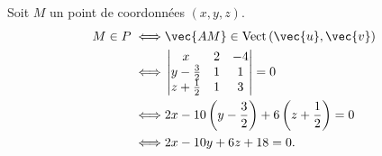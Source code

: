 \begin{enumerate}
		Soit $M$ un point de coordonnées $(x, y, z)$.
		\begin{align*}
			M \in P \iff& \vec{AM} \in \Vect\left( \vec{u}, \vec{v} \right)\\
			\iff&
			\begin{vmatrix}
				x&2&-4\\
				y-\frac{3}{2}&1&1\\
				z+\frac{1}{2}&1&3
			\end{vmatrix} = 0\\
			\iff& 2x - 10\left( y - \frac{3}{2} \right) + 6 \left( z + \frac{1}{2} \right) = 0\\
			\iff& 2x - 10y + 6z + 18 = 0.
		\end{align*}
\end{enumerate}



